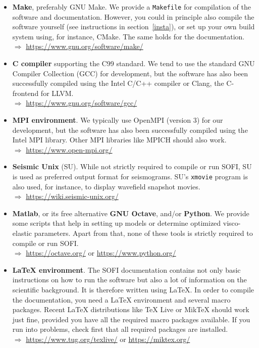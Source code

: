 \documentclass[11pt,english,a4paper]{article}
\begin{document}
\begin{itemize}
\item \textbf{Make}, preferably GNU Make. We provide a \texttt{Makefile} for compilation of the software and documentation. However, you could in principle also compile the software yourself (see instructions in section~\ref{insta}), or set up your own build system using, for instance, CMake. The same holds for the documentation.\\
$\Rightarrow$ \url{https://www.gnu.org/software/make/}
\item \textbf{C compiler} supporting the C99 standard. We tend to use the standard GNU Compiler Collection (GCC) for development, but the software has also been successfully compiled using the Intel C/C++ compiler or Clang, the C-frontend for LLVM.\\
$\Rightarrow$ \url{https://www.gnu.org/software/gcc/}
\item \textbf{MPI environment}. We typically use OpenMPI (version 3) for our development, but the software has also been successfully compiled using the Intel MPI library. Other MPI libraries like MPICH should also work.\\
$\Rightarrow$ \url{https://www.open-mpi.org/}
\item \textbf{Seismic Unix} (SU). While not strictly required to compile or run SOFI, SU is used as preferred output format for seismograms. SU's \texttt{xmovie} program is also used, for instance, to display wavefield snapshot movies.\\
$\Rightarrow$ \url{https://wiki.seismic-unix.org/}
\item \textbf{Matlab}, or its free alternative \textbf{GNU Octave}, and/or \textbf{Python}. We provide some scripts that help in setting up models or determine optimized visco-elastic parameters. Apart from that, none of these tools is strictly required to compile or run SOFI.\\
$\Rightarrow$ \url{https://octave.org/} or \url{https://www.python.org/}
\item \textbf{\LaTeX{} environment}. The SOFI documentation contains not only basic instructions on how to run the software but also a lot of information on the scientific background. It is therefore written using \LaTeX\@. In order to compile the documentation, you need a \LaTeX{} environment and several macro packages. Recent \LaTeX{} distributions like TeX Live or MikTeX should work just fine, provided you have all the required macro packages available. If you run into problems, check first that all required packages are installed.\\
$\Rightarrow$ \url{https://www.tug.org/texlive/} or \url{https://miktex.org/}
\end{itemize}
\end{document}
